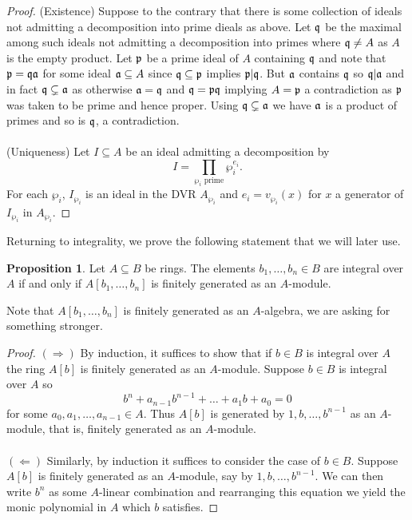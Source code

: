 \documentclass{amsart}
\theoremstyle{definition}
\newtheorem{proposition}[theorem]{Proposition}
\numberwithin{equation}{section}
\begin{document}
\begin{proof}
  (Existence) Suppose to the contrary that there is some collection of ideals not admitting a decomposition into prime dieals as above. Let $\mathfrak{q}$ be the maximal among such ideals not admitting a decomposition into primes where $\mathfrak{q}\neq A$ as $A$ is the empty product. Let $\mathfrak{p}$ be a prime ideal of $A$ containing $\mathfrak{q}$ and note that $\mathfrak{p}=\mathfrak{q}\mathfrak{a}$ for some ideal $\mathfrak{a}\subseteq A$ since $\mathfrak{q}\subseteq\mathfrak{p}$ implies $\mathfrak{p}|\mathfrak{q}$. But $\mathfrak{a}$ contains $\mathfrak{q}$ so $\mathfrak{q}|\mathfrak{a}$ and in fact $\mathfrak{q}\subsetneq\mathfrak{a}$ as otherwise $\mathfrak{a}=\mathfrak{q}$ and $\mathfrak{q}=\mathfrak{p}\mathfrak{q}$ implying $A=\mathfrak{p}$ a contradiction as $\mathfrak{p}$ was taken to be prime and hence proper. Using $\mathfrak{q}\subsetneq\mathfrak{a}$ we have $\mathfrak{a}$ is a product of primes and so is $\mathfrak{q}$, a contradiction. 
  \\\\
  (Uniqueness) Let $I\subseteq A$ be an ideal admitting a decomposition by 
  $$I=\prod_{\wp_{i}\text{ prime}}\wp_{i}^{e_{i}}.$$
  For each $\wp_{i}$, $I_{\wp_{i}}$ is an ideal in the DVR $A_{\wp_{i}}$ and $e_{i}=v_{\wp_{i}}(x)$ for $x$ a generator of $I_{\wp_{i}}$ in $A_{\wp_{i}}$.
\end{proof}
Returning to integrality, we prove the following statement that we will later use. 
\begin{proposition}
  Let $A\subseteq B$ be rings. The elements $b_{1},\dots,b_{n}\in B$ are integral over $A$ if and only if $A[b_{1},\dots,b_{n}]$ is finitely generated as an $A$-module. 
\end{proposition}
Note that $A[b_{1},\dots,b_{n}]$ is finitely generated as an $A$-algebra, we are asking for something stronger. 
\begin{proof}
  $(\Longrightarrow)$ By induction, it suffices to show that if $b\in B$ is integral over $A$ the ring $A[b]$ is finitely generated as an $A$-module. Suppose $b\in B$ is integral over $A$ so 
  $$b^{n}+a_{n-1}b^{n-1}+\dots+a_{1}b+a_{0}=0$$
  for some $a_{0}, a_{1},\dots, a_{n-1}\in A$. Thus $A[b]$ is generated by $1, b, \dots,b^{n-1}$ as an $A$-module, that is, finitely generated as an $A$-module. 
  \\\\
  $(\Longleftarrow)$ Similarly, by induction it suffices to consider the case of $b\in B$. Suppose $A[b]$ is finitely generated as an $A$-module, say by $1,b,\dots,b^{n-1}$. We can then write $b^{n}$ as some $A$-linear combination and rearranging this equation we yield the monic polynomial in $A$ which $b$ satisfies. 
\end{proof}
\newpage
\printbibliography
\end{document}
